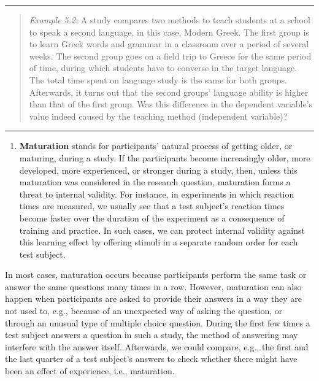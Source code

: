 \documentclass[
]{book}
\providecommand{\tightlist}{%
  \setlength{\itemsep}{0pt}\setlength{\parskip}{0pt}}
\begin{document}
\begin{center}\rule{0.5\linewidth}{0.5pt}\end{center}

\begin{quote}
\emph{Example 5.2}: A study compares two methods to teach students at a school to speak a second language, in this case, Modern Greek. The first group is to learn Greek words and grammar in a classroom over a period of several weeks. The second group goes on a field trip to Greece for the same period of time, during which students have to converse in the target language. The total time spent on language study is the same for both groups. Afterwards, it turns out that the second groups' language ability is higher than that of the first group. Was this difference in the dependent variable's value indeed caused by the teaching method (independent variable)?
\end{quote}

\begin{center}\rule{0.5\linewidth}{0.5pt}\end{center}

\begin{enumerate}
\def\labelenumi{\arabic{enumi}.}
\setcounter{enumi}{1}
\tightlist
\item
  \textbf{Maturation} stands for participants' natural process of getting older, or maturing, during a study. If the participants become increasingly older, more developed, more experienced, or stronger during a study, then, unless this maturation was considered in the research question, maturation forms a threat to internal validity. For instance, in experiments in which reaction times are measured, we usually see that a test subject's reaction times become faster over the duration of the experiment as a consequence of training and practice. In such cases, we can protect internal validity against this learning effect by offering stimuli in a separate random order for each test subject.
\end{enumerate}

In most cases, maturation occurs because participants perform the same task or answer the same questions many times in a row. However, maturation can also happen when participants are asked to provide their answers in a way they are not used to, e.g., because of an unexpected way of asking the question, or through an unusual type of multiple choice question. During the first few times a test subject answers a question in such a study, the method of answering may interfere with the answer itself. Afterwards, we could compare, e.g., the first and the last quarter of a test subject's answers to check whether there might have been an effect of experience, i.e., maturation.
\end{document}
